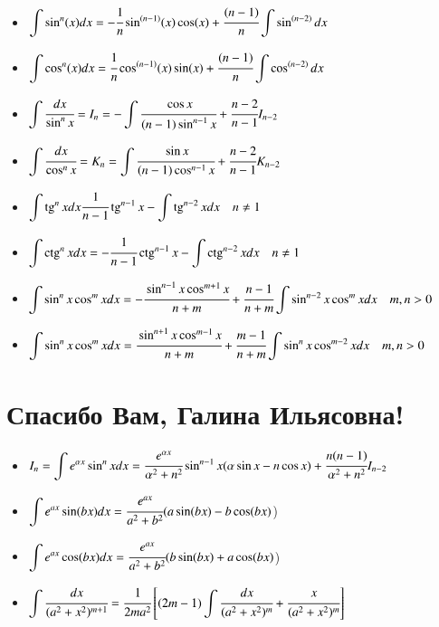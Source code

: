 \documentclass[twoside, a4paperpt]{extarticle}
\begin{document}
\begin{itemize}
    \item $\displaystyle \int \sin ^{n}(x) d x=-\cfrac{1}{n} \sin ^{(n-1)}(x) \cos (x)+\cfrac{(n-1)}{n} \displaystyle \int \sin ^{(n-2)} d x $
    \item $\displaystyle \int \cos ^{n}(x) d x=\cfrac{1}{n} \cos ^{(n-1)}(x) \sin (x)+\cfrac{(n-1)}{n} \displaystyle \int \cos ^{(n-2)} d x $
    \item $\displaystyle \int \cfrac{d x}{\sin ^{n} x}=I_{n}=-\displaystyle \int \cfrac{\cos x}{(n-1) \sin ^{n-1} x}+\cfrac{n-2}{n-1} I_{n-2} $
    \item $\displaystyle \int \cfrac{d x}{\cos ^{n} x}=K_{n}=\displaystyle \int \cfrac{\sin x}{(n-1) \cos ^{n-1} x}+\cfrac{n-2}{n-1} K_{n-2} $
    \item $\displaystyle \int \operatorname{tg}^{n} x d x  \cfrac{1}{n-1} \operatorname{tg}^{n-1} x-\displaystyle \int \operatorname{tg}^{n-2} x d x \quad n \neq 1 $
    \item $\displaystyle \int \operatorname{ctg}^{n} x d x  =-\cfrac{1}{n-1} \operatorname{ctg}^{n-1} x-\displaystyle \int \operatorname{ctg}^{n-2} x d x \quad n \neq 1 $
    \item $\displaystyle \int \sin ^{n} x \cos ^{m} x d x=-\cfrac{\sin ^{n-1} x \cos ^{m+1} x}{n+m}+\cfrac{n-1}{n+m} \displaystyle \int \sin ^{n-2} x \cos ^{m} x d x \quad m, n>0 $
    \item $\displaystyle \int \sin ^{n} x \cos ^{m} x d x=\cfrac{\sin ^{n+1} x \cos ^{m-1} x}{n+m}+\cfrac{m-1}{n+m} \displaystyle \int \sin ^{n} x \cos ^{m-2} x d x \quad m, n>0$
\end{itemize}

\section*{Спасибо Вам, Галина Ильясовна!}
\begin{itemize}
    \item $I_{n}=\displaystyle \int e^{\alpha x} \sin ^{n} x d x=\cfrac{e^{\alpha x}}{\alpha^{2}+n^{2}} \sin ^{n-1} x(\alpha \sin x-n \cos x)+\cfrac{n(n-1)}{\alpha^{2}+n^{2}} I_{n-2}$
    \item $\displaystyle \int  e^{ax} \sin(bx) dx = \cfrac{e^{ax}}{a^2 + b^2} (a \sin(bx) - b \cos(bx)$)
    \item $\displaystyle \int  e^{ax} \cos(bx) dx = \cfrac{e^{ax}}{a^2 + b^2} (b \sin(bx) + a \cos(bx)$)
    \item $\displaystyle \int \cfrac{d x}{(a^2 + x^2)^{m+1}} = \cfrac{1}{2 m a^2} \left[ (2m - 1) \displaystyle \int \cfrac{d x} {(a^2 + x^2)^m} + \cfrac{x}{(a^2 + x^2)^m}\right]$
\end{itemize}
\end{document}
